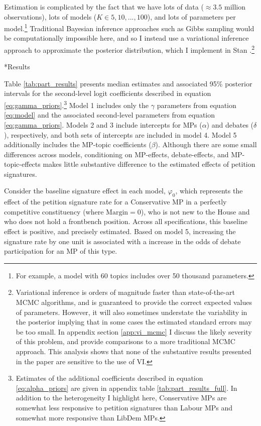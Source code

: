\documentclass[12pt]{article}
\makeatletter
\renewcommand{\section}{\@startsection{section}{1}{0mm}{-\baselineskip}{0.20\baselineskip}{\centering\normalfont\normalsize\scshape}}
\makeatother
\begin{document}
Estimation is complicated by the fact that we have lots of data ($\approx 3.5$ million observations), lots of models ($K \in 5,10,...,100$), and lots of parameters per model.\footnote{For example, a model with 60 topics includes over 50 thousand parameters.} Traditional Bayesian inference approaches such as Gibbs sampling would be computationally impossible here, and so I instead use a variational inference approach \citep{kucukelbir2017automatic} to approximate the posterior distribution, which I implement in Stan \citep{carpenter2016stan}.\footnote{Variational inference is orders of magnitude faster than state-of-the-art MCMC algorithms, and is guaranteed to provide the correct expected values of parameters. However, it will also sometimes understate the variability in the posterior implying that in some cases the estimated standard errors may be too small. In appendix section \ref{app:vi_mcmc} I discuss the likely severity of this problem, and provide comparisons to a more traditional MCMC approach. This analysis shows that none of the substantive results presented in the paper are sensitive to the use of VI.}


\section*{Results}

Table \ref{tab:part_results} presents median estimates and associated 95\% posterior intervals for the second-level logit coefficients described in equation \ref{eq:gamma_priors}.\footnote{Estimates of the additional coefficients described in equation \ref{eq:alpha_priors} are given in appendix table \ref{tab:part_results_full}. In addition to the heterogeneity I highlight here, Conservative MPs are somewhat less responsive to petition signatures than Labour MPs and somewhat more responsive than LibDem MPs.} Model 1 includes only the $\gamma$ parameters from equation \ref{eq:model} and the associated second-level parameters from equation \ref{eq:gamma_priors}. Models 2 and 3 include intercepts for MPs ($\alpha$) and debates ($\delta$), respectively, and both sets of intercepts are included in model 4. Model 5 additionally includes the MP-topic coefficients ($\beta$). Although there are some small differences across models, conditioning on MP-effects, debate-effects, and MP-topic-effects makes little substantive difference to the estimated effects of petition signatures.  

Consider the baseline signature effect in each model, $\varphi_0$, which represents the effect of the petition signature rate for a Conservative MP in a perfectly competitive constituency (where $\text{Margin} = 0$), who is not new to the House and who does not hold a frontbench position. Across all specifications, this baseline effect is positive, and precisely estimated. Based on model 5, increasing the signature rate by one unit is associated with a  increase in the odds of debate participation for an MP of this type. 
\end{document}
